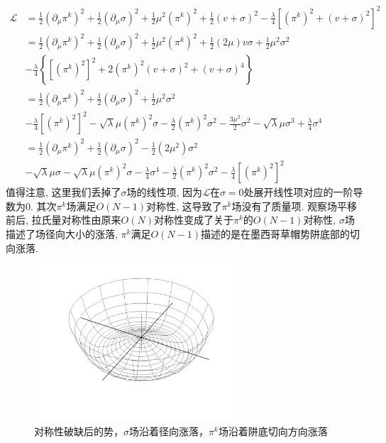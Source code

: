 \documentclass[a4paper,11pt]{article}
\begin{document}
\begin{equation*}
  \begin{split}
     \mathcal{L}&=\frac{1}{2}(\partial_\mu\pi^k)^2+\frac{1}{2}(\partial_\mu\sigma)^2+\frac{1}{2}\mu^2(\pi^k)^2+\frac{1}{2}(v+\sigma)^2-\frac{\lambda}{4}[(\pi^k)^2+(v+\sigma)^2]^2\\
       &=\frac{1}{2}(\partial_\mu\pi^k)^2+\frac{1}{2}(\partial_\mu\sigma)^2+\frac{1}{2}\mu^2(\pi^k)^2+\frac{1}{2}(2\mu)v\sigma+\frac{1}{2}\mu^2\sigma^2\\
       &-\frac{\lambda}{4}\left\{[(\pi^k)^2]^2+2(\pi^k)^2(v+\sigma)^2+(v+\sigma)^4\right\}\\
       &=\frac{1}{2}(\partial_\mu\pi^k)^2+\frac{1}{2}(\partial_\mu\sigma)^2+\frac{1}{2}\mu^2\sigma^2\\
       &-\frac{\lambda}{4}[(\pi^k)^2]^2-\sqrt{\lambda}\mu(\pi^k)^2\sigma-\frac{\lambda}{2}(\pi^k)^2\sigma^2-\frac{3\mu^2}{2}\sigma^2-\sqrt{\lambda}\mu\sigma^3+\frac{\lambda}{4}\sigma^4\\
       &=\frac{1}{2}(\partial_\mu\pi^k)^2+\frac{1}{2}(\partial_\mu\sigma)^2-\frac{1}{2}(2\mu^2)\sigma^2\\
       &-\sqrt{\lambda}\mu\sigma-\sqrt{\lambda}\mu(\pi^k)^2\sigma-\frac{\lambda}{4}\sigma^4-\frac{\lambda}{2}(\pi^k)^2\sigma^2-\frac{\lambda}{4}[(\pi^k)^2]^2
  \end{split}
\end{equation*}
值得注意, 这里我们丢掉了$\sigma$场的线性项, 因为$\mathcal{L}$在$\sigma=0$处展开线性项对应的一阶导数为$0$. 其次$\pi^k$场满足$O(N-1)$对称性, 这导致了$\pi^k$场没有了质量项. 观察场平移前后, 拉氏量对称性由原来$O(N)$对称性变成了关于$\pi^k$的$O(N-1)$对称性, $\sigma$场描述了场径向大小的涨落, $\pi^k$满足$O(N-1)$描述的是在墨西哥草帽势阱底部的切向涨落.
\begin{figure}[H]
  \centering
  \includegraphics[width=3in]{3.pdf}
  \caption{对称性破缺后的势，$\sigma$场沿着径向涨落，$\pi^k$场沿着阱底切向方向涨落}
\end{figure}
\end{document}
